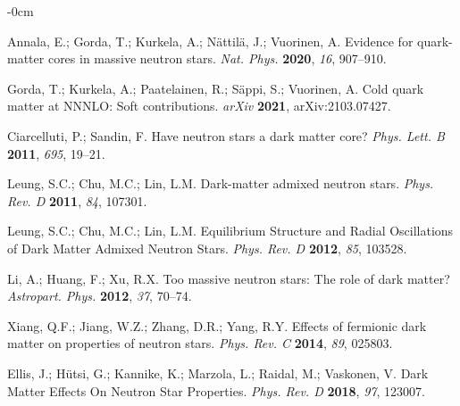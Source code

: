 \documentclass[universe,article,accept,moreauthors,pdftex]{Definitions/mdpi}
\begin{document}
\begin{adjustwidth}{-\extralength}{0cm}
\begin{thebibliography}{999}
Annala, E.; Gorda, T.; Kurkela, A.; N\"attil\"a, J.; Vuorinen, A. 
Evidence for quark-matter cores in massive neutron stars. 
\emph{Nat. Phys.} \textbf{2020}, \emph{16}, 907--910.

Gorda, T.; Kurkela, A.; Paatelainen, R.; S\"appi, S.; Vuorinen, A. 
Cold quark matter at NNNLO: Soft contributions. 
\emph{arXiv}  \textbf{2021}, arXiv:2103.07427.

Ciarcelluti, P.; Sandin, F. 
Have neutron stars a dark matter core? 
\emph{Phys. Lett. B} \textbf{2011}, \emph{695}, 19--21.

Leung, S.C.; Chu, M.C.; Lin, L.M. 
Dark-matter admixed neutron stars. 
\emph{Phys. Rev. D}  \textbf{2011}, \emph{84}, 107301.

Leung, S.C.; Chu, M.C.; Lin, L.M. 
Equilibrium Structure and Radial Oscillations of Dark Matter Admixed Neutron Stars. 
\emph{Phys. Rev. D} \textbf{2012}, \emph{85}, 103528.

Li, A.; Huang, F.; Xu, R.X. 
Too massive neutron stars: The role of dark matter? 
\emph{Astropart. Phys.}  \textbf{2012}, \emph{37}, 70--74.

Xiang, Q.F.; Jiang, W.Z.; Zhang, D.R.; Yang, R.Y. 
Effects of fermionic dark matter on properties of neutron stars. 
\emph{Phys. Rev. C} \textbf{2014}, \emph{89}, 025803.

Ellis, J.; H\"utsi, G.; Kannike, K.; Marzola, L.; Raidal, M.; Vaskonen, V. 
Dark Matter Effects On Neutron Star Properties. 
\emph{Phys. Rev. D} \textbf{2018}, \emph{97}, 123007.


\end{thebibliography}
\end{adjustwidth}
\end{document}
